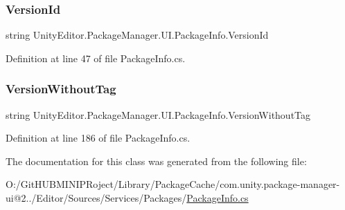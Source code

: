\mbox{\label{class_unity_editor_1_1_package_manager_1_1_u_i_1_1_package_info_a38b2a5d09fa5b462e10f9cc8b470ee41}} 
\subsubsection{\texorpdfstring{VersionId}{VersionId}}
{\footnotesize\ttfamily string Unity\+Editor.\+Package\+Manager.\+U\+I.\+Package\+Info.\+Version\+Id\hspace{0.3cm}{\ttfamily [get]}}



Definition at line 47 of file Package\+Info.\+cs.

\mbox{\label{class_unity_editor_1_1_package_manager_1_1_u_i_1_1_package_info_a6ee0efc0cc759fedb012c3ffe8addc9d}} 
\subsubsection{\texorpdfstring{VersionWithoutTag}{VersionWithoutTag}}
{\footnotesize\ttfamily string Unity\+Editor.\+Package\+Manager.\+U\+I.\+Package\+Info.\+Version\+Without\+Tag\hspace{0.3cm}{\ttfamily [get]}}



Definition at line 186 of file Package\+Info.\+cs.



The documentation for this class was generated from the following file\+:\begin{DoxyCompactItemize}
\item 
O\+:/\+Git\+H\+U\+B\+M\+I\+N\+I\+P\+Roject/\+Library/\+Package\+Cache/com.\+unity.\+package-\/manager-\/ui@2../\+Editor/\+Sources/\+Services/\+Packages/\mbox{\hyperlink{_package_info_8cs}{Package\+Info.\+cs}}\end{DoxyCompactItemize}
